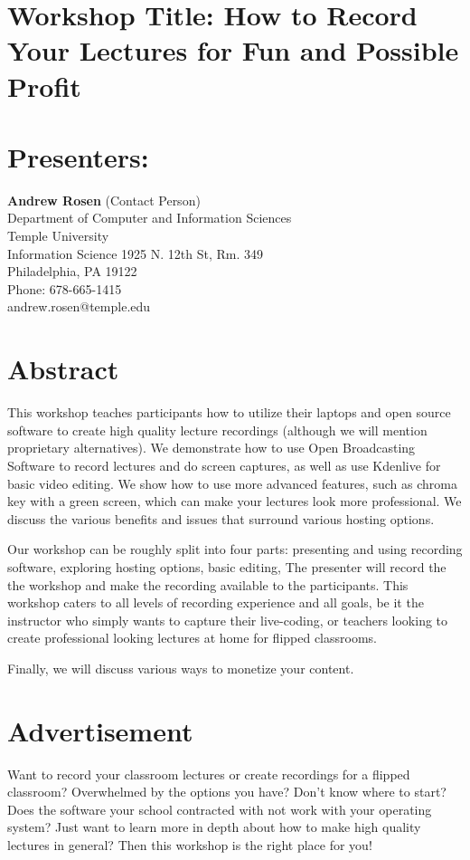 \documentclass[10pt,letterpaper]{article}
\begin{document}
	
\section*{Workshop Title: How to Record Your Lectures for Fun and Possible Profit}

\section*{Presenters:}
\textbf{Andrew Rosen} (Contact Person)\\
Department of Computer and Information Sciences\\
Temple University\\
Information Science 1925 N. 12th St, Rm. 349 \\
Philadelphia, PA 19122\\
Phone: 678-665-1415\\
andrew.rosen@temple.edu
\newpage
\section*{Abstract}
This workshop teaches participants how to utilize their laptops and open source software to create high quality lecture recordings (although we will mention proprietary alternatives).
We demonstrate how to use Open Broadcasting Software to record lectures and do screen captures, as well as use Kdenlive for basic video editing.
We show how to use more advanced features, such as chroma key with a green screen, which can make your lectures look more professional.
We discuss the various benefits and issues that surround various hosting options.

Our workshop can be roughly split into four parts: presenting and using recording software, exploring hosting options, basic editing, 
The presenter will record the the workshop and make the recording available to the participants.
This workshop caters to all levels of recording experience and all goals, be it the instructor who simply wants to capture their live-coding, or teachers looking to create professional looking lectures at home for flipped classrooms.

Finally, we will discuss various ways to monetize your content.

\section*{Advertisement}
Want to record your classroom lectures or create recordings for a flipped classroom?
Overwhelmed by the options you have?
Don't know where to start?
Does the software your school contracted with not work with your operating system?
Just want to learn more in depth about how to make high quality lectures in general?
Then this workshop is the right place for you!
\end{document}
